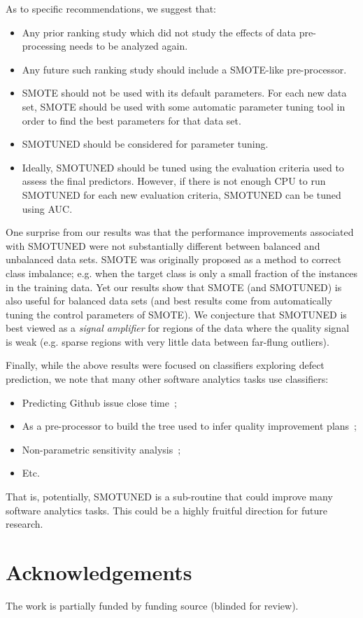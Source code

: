 \documentclass[10pt,conference]{IEEEtran}
\newcommand{\bi}{\begin{itemize}[leftmargin=0.4cm]}
\newcommand{\ei}{\end{itemize}}
\theoremstyle{break}
\theoremstyle{break}
\newcommand{\sma}{{\sc SMOTE}}
\newcommand{\smb}{{\sc SMOTUNED}}
\begin{document}
\noindent
As to specific recommendations,
we suggest that:
\bi
 \item Any prior ranking study  which did not  study the effects of data pre-processing needs to be analyzed again.
 \item Any future such ranking study should include a {\sma}-like
 pre-processor.
 \item {\sma} should not be used with its default parameters.
 For each new data set,
{\sma} should be used with some automatic parameter tuning tool in
order to find the best parameters for that data set.
\item {\smb} should be considered for parameter tuning.
\item Ideally, {\smb} should be tuned using the evaluation criteria used to assess the final predictors.
However, if there is not enough CPU to run {\smb} for each new evaluation criteria, {\smb} can be tuned using AUC.
\ei
One surprise from our results was that the performance improvements associated with {\smb} were not substantially different between balanced and unbalanced data sets.
 {\sma} was originally proposed as a method to correct class imbalance; e.g. when the target class is only a small fraction of the instances in the training data.
 Yet our results show that {\sma} (and {\smb}) is also useful for balanced data sets (and best results come from automatically tuning the control parameters of {\sma}). We conjecture that {\smb}
is best viewed as a   {\em signal amplifier} for regions of the data where the quality signal is weak  (e.g. sparse regions with very little data between far-flung outliers).


 


Finally, while the above results were focused on classifiers exploring defect prediction, we note that many other software analytics
tasks use classifiers:
\bi
\item Predicting Github issue close time~\cite{jones17};
\item As a pre-processor to build the tree used to 
infer quality improvement plans~\cite{krishna2017less};
\item Non-parametric sensitivity analysis~\cite{menzies2000practical};
\item Etc.
\ei
That is, potentially, {\smb} is  a sub-routine that could improve many software analytics tasks. This could be a highly fruitful direction for future research.

\section*{Acknowledgements}
The work is partially funded by
funding source (blinded for review).

 \newpage
\balance



%
\medskip
 
\end{document}
